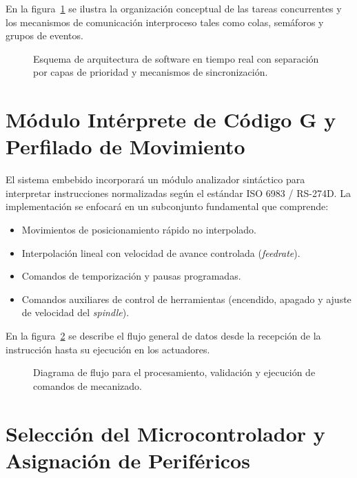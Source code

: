 En la figura~\ref{fig.ej3:arquitectura_freertos} se ilustra la organización conceptual de las tareas concurrentes y los
mecanismos de comunicación interproceso tales como colas, semáforos y grupos de eventos.

\begin{figure}[!ht]
  \centering
  \resizebox{0.88\linewidth}{!}{}
  \caption{Esquema de arquitectura de software en tiempo real con separación por capas de prioridad y mecanismos de sincronización.}
  \label{fig.ej3:arquitectura_freertos}
\end{figure}

\section{Módulo Intérprete de Código G y Perfilado de Movimiento}
\label{sec:td2_gcode}

El sistema embebido incorporará un módulo analizador sintáctico para interpretar instrucciones normalizadas según el
estándar ISO 6983 / RS-274D. La implementación se enfocará en un subconjunto fundamental que comprende:
\begin{itemize}
  \item Movimientos de posicionamiento rápido no interpolado.
  \item Interpolación lineal con velocidad de avance controlada (\textit{feedrate}).
  \item Comandos de temporización y pausas programadas.
  \item Comandos auxiliares de control de herramientas (encendido, apagado y ajuste de velocidad del \textit{spindle}).
\end{itemize}

En la figura~\ref{fig.ej3:flujo_gcode} se describe el flujo general de datos desde la recepción de la instrucción hasta
su ejecución en los actuadores.

\begin{figure}[!ht]
  \centering
  
  \caption{Diagrama de flujo para el procesamiento, validación y ejecución de comandos de mecanizado.}
  \label{fig.ej3:flujo_gcode}
\end{figure}

\section{Selección del Microcontrolador y Asignación de Periféricos}
\label{sec:td2_perifericos}

